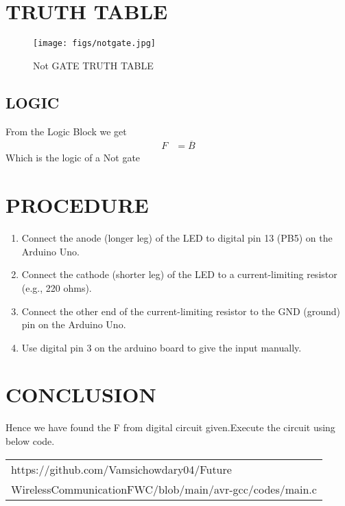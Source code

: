 \documentclass[journal,12pt,twocolumn]{IEEEtran}
\begin{document}
\section{TRUTH TABLE}
\begin{figure}[h!]
\centering
\texttt{[image: figs/notgate.jpg]}
\caption{Not GATE TRUTH TABLE}
\label{fig:notgate.png}
\end{figure}

\subsection{LOGIC}
From the Logic Block  we get
\begin{align}
  F&=\overline{B}
\end{align}
Which is the logic of a Not gate










\section{PROCEDURE}
\begin{enumerate}
\item Connect the anode (longer leg) of the LED to digital pin 13 (PB5) on the Arduino Uno.
\item Connect the cathode (shorter leg) of the LED to a current-limiting resistor (e.g., 220 ohms).
\item Connect the other end of the current-limiting resistor to the GND (ground) pin on the Arduino Uno.
\item Use digital pin 3 on the arduino board to give the input manually.
\end{enumerate}

\section{CONCLUSION}
Hence we have found the F from  digital circuit given.Execute the circuit using below code.

   \begin{tabularx}{0.46\textwidth} { 
  | >{\centering\arraybackslash}X |}
  \hline
https://github.com/Vamsichowdary04/Future\\\-Wireless\-Communication\-FWC\-/blob/main/avr-gcc/codes/main.c\\
  \hline
\end{tabularx}


\end{document}
